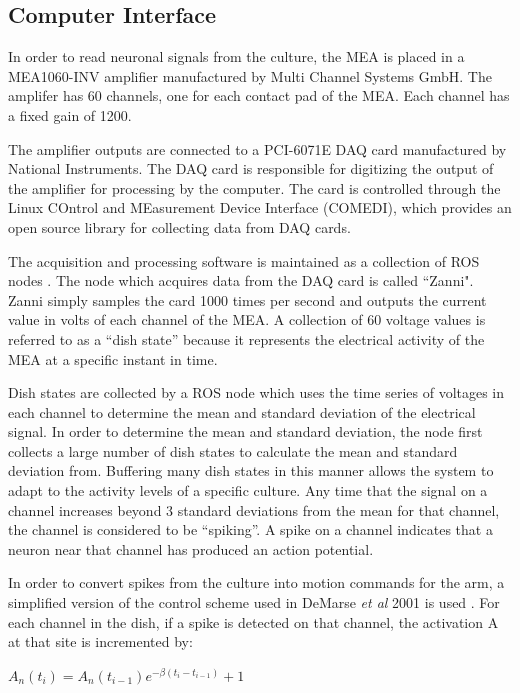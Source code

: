 \documentclass[letterpaper]{article}
\begin{document}
\subsection{Computer Interface}

In order to read neuronal signals from the culture, the MEA is placed in a MEA1060-INV amplifier manufactured by Multi Channel Systems GmbH. 
The amplifer has 60 channels, one for each contact pad of the MEA.
Each channel has a fixed gain of 1200.

The amplifier outputs are connected to a PCI-6071E DAQ card manufactured by National Instruments. 
The DAQ card is responsible for digitizing the output of the amplifier for processing by the computer. 
The card is controlled through the Linux COntrol and MEasurement Device Interface (COMEDI), which provides an open source library for collecting data from DAQ cards. 

The acquisition and processing software is maintained as a collection of ROS nodes \cite{ROSAnnouncementPaper}.
The node which acquires data from the DAQ card is called ``Zanni". 
Zanni simply samples the card 1000 times per second and outputs the current value in volts of each channel of the MEA. 
A collection of 60 voltage values is referred to as a ``dish state'' because it represents the electrical activity of the MEA at a specific instant in time. 

Dish states are collected by a ROS node which uses the time series of voltages in each channel to determine the mean and standard deviation of the electrical signal. 
In order to determine the mean and standard deviation, the node first collects a large number of dish states to calculate the mean and standard deviation from. 
Buffering many dish states in this manner allows the system to adapt to the activity levels of a specific culture. 
Any time that the signal on a channel increases beyond 3 standard deviations from the mean for that channel, the channel is considered to be ``spiking''. 
A spike on a channel indicates that a neuron near that channel has produced an action potential. 

In order to convert spikes from the culture into motion commands for the arm, a simplified version of the control scheme used in DeMarse \textit{et al} 2001 is used \cite{demarse2001neurally}. 
For each channel in the dish, if a spike is detected on that channel, the activation A at that site is incremented by: 

$A_n (t_i) = A_n(t_{i-1})e^{-\beta(t_i - t_{i-1})} + 1$
\end{document}
